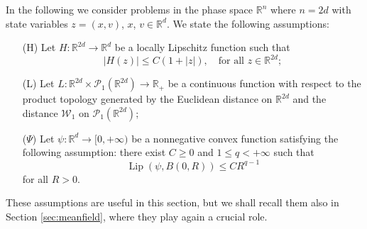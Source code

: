 \documentclass[11pt]{article}
\theoremstyle{plain}
\theoremstyle{definition}
\theoremstyle{remark}
\numberwithin{equation}{section}
\newcommand{\R}{{\mathbb R}}
\begin{document}
In the following we consider problems in the phase space $\mathbb R^n$ where $n=2d$ with state variables $z=(x,v)$, $x$, $v\in \R^d$.
We state the following assumptions:
\begin{itemize}
\item[(H)] Let $H\colon \R^{2d} \to \R^{d}$ be a locally Lipschitz function such that
\begin{equation}\label{lingrowth}
|H(z)|\le C(1+|z|), \quad \mbox{for all } z \in \mathbb R^{2d};
\end{equation}
\item[(L)]  Let $L: \mathbb R^{2d} \times \mathcal P_1 (\mathbb R^{2d})\to \mathbb R_+$
be a continuous function with respect to the product topology generated by the Euclidean distance on $\R^{2d}$ and the distance $\mathcal W_1$ on $\mathcal P_1 (\mathbb R^{2d})$;
\item[($\Psi$)] Let $\psi: \R^d \to [0,+\infty)$ be a nonnegative convex function satisfying the following assumption: there exist $C\ge 0$ and $1\le q<+\infty$ such that
\begin{equation}\label{psilip2}
\operatorname{Lip}(\psi, B(0, R))\le C R^{q-1}
\end{equation}
for all $R>0$.
\end{itemize}
These assumptions are useful in this section, but we shall recall them also in Section \ref{sec:meanfield}, where they play again a crucial role.
\end{document}
